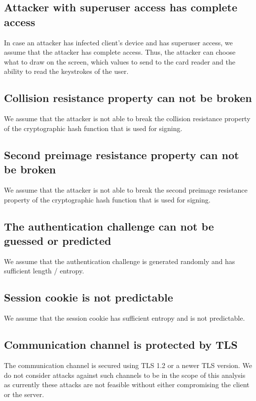 \subsection{Attacker with superuser access has complete access} 
In case an attacker has infected client's device and has superuser access, we assume that the attacker has complete access. Thus, the attacker can choose what to draw on the screen, which values to send to the card reader and the ability to read the keystrokes of the user.

\subsection{Collision resistance property can not be broken} 
We assume that the attacker is not able to break the collision resistance property of the cryptographic hash function that is used for signing.


\subsection{Second preimage resistance property can not be broken} 
We assume that the attacker is not able to break the second preimage resistance property of the cryptographic hash function that is used for signing.

\subsection{The authentication challenge can not be guessed or predicted}
We assume that the authentication challenge is generated randomly and has sufficient length / entropy.
 
\subsection{Session cookie is not predictable} 
We assume that the session cookie has sufficient entropy and is not predictable.

\subsection{Communication channel is protected by TLS}
The communication channel is secured using TLS 1.2 or a newer TLS version. We do not consider attacks against such channels to be in the scope of this analysis as currently these attacks are not feasible without either compromising the client or the server.

